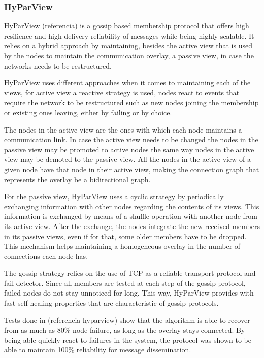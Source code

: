 \subsubsection{HyParView}
\label{subsec:hyparview}

HyParView (referencia) is a gossip based membership protocol that offers high
resilience and high delivery reliability of messages while being highly scalable.
It relies on a hybrid approach by maintaining, besides the active view that is 
used by the nodes to maintain the communication overlay, a passive view, in case
the networks needs to be restructured.

HyParView uses different approaches when it comes to maintaining each of the views,
for active view a reactive strategy is used, nodes react to events that require 
the network to be restructured such as new nodes joining the membership or
existing ones leaving, either by failing or by choice.

The nodes in the active view are the ones with which each node maintains a
communication link. In case the active view needs to be changed the nodes in
the passive view may be promoted to active nodes the same way nodes in the
active view may be demoted to the passive view. All the nodes in the active
view of a given node have that node in their active view, making the connection
graph that represents the overlay be a bidirectional graph.

For the passive view, HyParView uses a cyclic strategy by periodically exchanging
information with other nodes regarding the contents of its views. This information
is exchanged by means of a shuffle operation with another node from its active view.
After the exchange, the nodes integrate the new received members in its
passive views, even if for that, some older members have to be dropped. This
mechanism helps maintaining a homogeneous overlay in the number of connections
each node has.

The gossip strategy relies on the use of TCP as a reliable transport protocol and fail
detector. Since all members are tested at each step of the gossip protocol, failed nodes
do not stay unnoticed for long. This way, HyParView provides with fast self-healing
properties that are characteristic of gossip protocols.

Tests done in (referencia hyparview) show that the algorithm is able to recover from as much as 80\%
node failure, as long as the overlay stays connected. By being able quickly react to failures
in the system, the protocol was shown to be able to maintain 100\% reliability 
for message dissemination.


